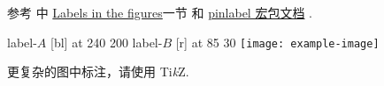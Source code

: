 参考 \cite{wiki-floats} 中 \href{https://en.wikibooks.org/wiki/LaTeX/Floats,\_Figures\_and\_Captions\#Labels\_in\_the\_figures}{Labels in the figures}一节 和 \href{http://mirrors.ctan.org/macros/latex/contrib/pinlabel/pinlabdoc.pdf}{pinlabel 宏包文档} \cite{pinlabel}.
\begin{vertlst}

\hair 2pt
\pinlabel label-$A$ [bl] at 240 200
\pinlabel label-$B$ [r] at 85 30
\endlabellist
\centering
\texttt{[image: example-image]}
\end{vertlst}
更复杂的图中标注，请使用 Ti\emph{k}Z.